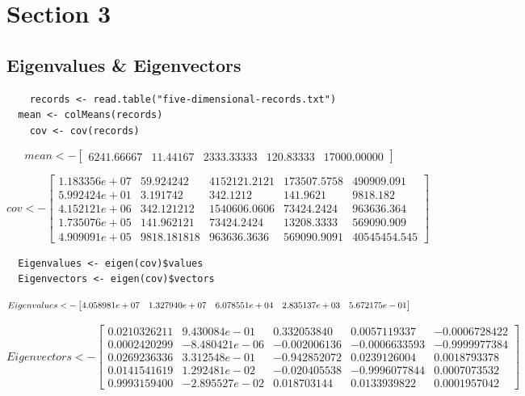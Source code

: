 \documentclass{report}
\begin{document}
\chapter{Section 3}

\section{Eigenvalues \& Eigenvectors}

\begin{verbatim}
	records <- read.table("five-dimensional-records.txt")
  mean <- colMeans(records)
	cov <- cov(records)
\end{verbatim}

\[
  mean <- 
  \begin{bmatrix}
    6241.66667 & 11.44167 & 2333.33333 & 120.83333 & 17000.00000
  \end{bmatrix}
\]

\[
  cov <- 
  \begin{bmatrix}
	1.183356e+07 & 59.924242 & 4152121.2121 & 173507.5758 & 490909.091 \\
	5.992424e+01 & 3.191742 & 342.1212 & 141.9621 & 9818.182 \\
	4.152121e+06 & 342.121212 & 1540606.0606 & 73424.2424 & 963636.364 \\
	1.735076e+05 & 141.962121 & 73424.2424 & 13208.3333 & 569090.909 \\
	4.909091e+05 & 9818.181818 & 963636.3636 & 569090.9091 & 40545454.545
  \end{bmatrix}
\]

\begin{verbatim}
  Eigenvalues <- eigen(cov)$values
  Eigenvectors <- eigen(cov)$vectors
\end{verbatim}

\[
  Eigenvalues <- 
  \begin{bmatrix}
	  4.058981e+07 & 1.327940e+07 & 6.078551e+04 & 2.835137e+03 & 5.672175e-01
  \end{bmatrix} \\
\]

\[
  Eigenvectors <- 
  \begin{bmatrix}
    0.0210326211 & 9.430084e-01 & 0.332053840 & 0.0057119337 & -0.0006728422 \\
    0.0002420299 & -8.480421e-06 & -0.002006136 & -0.0006633593 & -0.9999977384 \\
    0.0269236336 & 3.312548e-01 & -0.942852072 & 0.0239126004 & 0.0018793378 \\
    0.0141541619 & 1.292481e-02 & -0.020405538 & -0.9996077844 & 0.0007073532 \\
    0.9993159400 & -2.895527e-02 & 0.018703144 & 0.0133939822 & 0.0001957042
  \end{bmatrix}
\]
\end{document}

